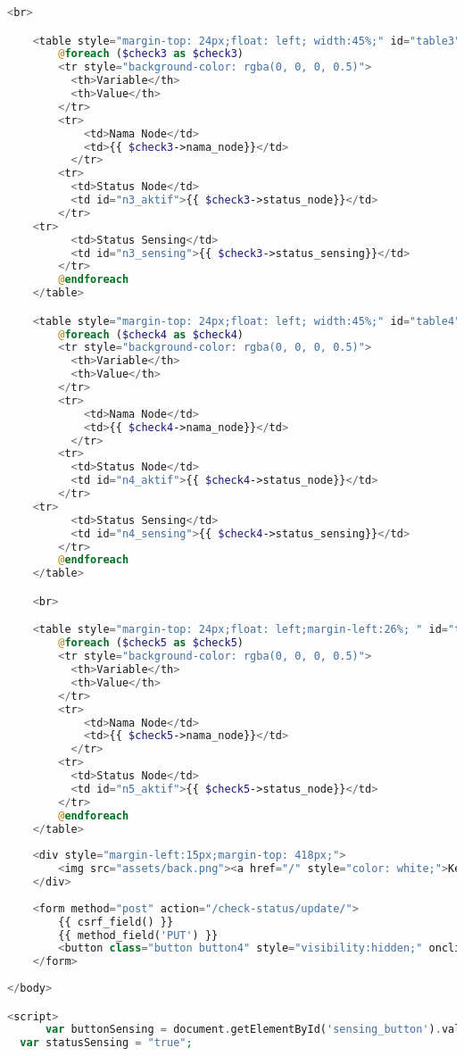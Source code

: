 \begin{lstlisting}[language=PHP, caption=skripsi\_checkstatus.blade.php]
    <br>

    <table style="margin-top: 24px;float: left; width:45%;" id="table3">
        @foreach ($check3 as $check3)
        <tr style="background-color: rgba(0, 0, 0, 0.5)">
          <th>Variable</th>
          <th>Value</th> 
        </tr>
        <tr>
            <td>Nama Node</td>
            <td>{{ $check3->nama_node}}</td>
          </tr>
        <tr>
          <td>Status Node</td>
          <td id="n3_aktif">{{ $check3->status_node}}</td>
        </tr>
	<tr>
          <td>Status Sensing</td>
          <td id="n3_sensing">{{ $check3->status_sensing}}</td>
        </tr>
        @endforeach
    </table>

    <table style="margin-top: 24px;float: left; width:45%;" id="table4">
        @foreach ($check4 as $check4)
        <tr style="background-color: rgba(0, 0, 0, 0.5)">
          <th>Variable</th>
          <th>Value</th> 
        </tr>
        <tr>
            <td>Nama Node</td>
            <td>{{ $check4->nama_node}}</td>
          </tr>
        <tr>
          <td>Status Node</td>
          <td id="n4_aktif">{{ $check4->status_node}}</td>
        </tr>
	<tr>
          <td>Status Sensing</td>
          <td id="n4_sensing">{{ $check4->status_sensing}}</td>
        </tr>
        @endforeach
    </table>

    <br>

    <table style="margin-top: 24px;float: left;margin-left:26%; " id="table5">
        @foreach ($check5 as $check5)
        <tr style="background-color: rgba(0, 0, 0, 0.5)">
          <th>Variable</th>
          <th>Value</th> 
        </tr>
        <tr>
            <td>Nama Node</td>
            <td>{{ $check5->nama_node}}</td>
          </tr>
        <tr>
          <td>Status Node</td>
          <td id="n5_aktif">{{ $check5->status_node}}</td>
        </tr>
        @endforeach
    </table>
    
    <div style="margin-left:15px;margin-top: 418px;">
        <img src="assets/back.png"><a href="/" style="color: white;">Kembali</a>
    </div>
    
    <form method="post" action="/check-status/update/">
        {{ csrf_field() }}
        {{ method_field('PUT') }}
        <button class="button button4" style="visibility:hidden;" onclick="changeButtonText()" value="online" id="sensing_button" style="margin-top: 140px;margin-right: 15px;">Update</button>
    </form>
    
</body>

<script>
      var buttonSensing = document.getElementById('sensing_button').value;
  var statusSensing = "true";
  

\end{lstlisting}
